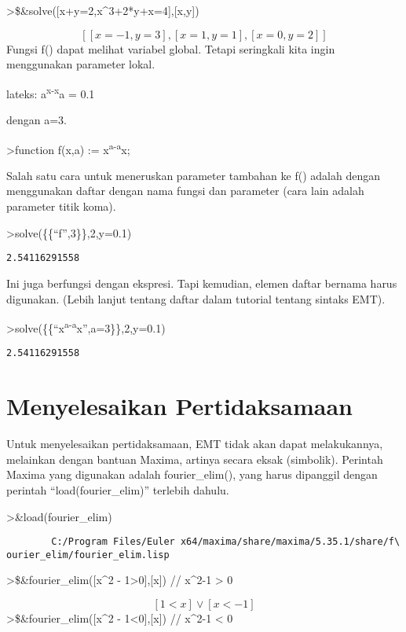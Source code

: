 \documentclass[
]{book}
\begin{document}
\textgreater\$\&solve({[}x+y=2,x\^{}3+2*y+x=4{]},{[}x,y{]})

\[\left[ \left[ x=-1 , y=3 \right]  , \left[ x=1 , y=1 \right]  , \left[ x=0 , y=2 \right]  \right]\]Fungsi f() dapat melihat variabel global. Tetapi seringkali kita ingin menggunakan parameter lokal.

lateks: a\textsuperscript{x-x}a = 0.1

dengan a=3.

\textgreater function f(x,a) := x\textsuperscript{a-a}x;

Salah satu cara untuk meneruskan parameter tambahan ke f() adalah dengan menggunakan daftar dengan nama fungsi dan parameter (cara lain adalah parameter titik koma).

\textgreater solve(\{\{``f'',3\}\},2,y=0.1)

\begin{verbatim}
2.54116291558
\end{verbatim}

Ini juga berfungsi dengan ekspresi. Tapi kemudian, elemen daftar bernama harus digunakan. (Lebih lanjut tentang daftar dalam tutorial tentang sintaks EMT).

\textgreater solve(\{\{``x\textsuperscript{a-a}x'',a=3\}\},2,y=0.1)

\begin{verbatim}
2.54116291558
\end{verbatim}

\chapter{Menyelesaikan Pertidaksamaan}\label{menyelesaikan-pertidaksamaan}

Untuk menyelesaikan pertidaksamaan, EMT tidak akan dapat melakukannya, melainkan dengan bantuan Maxima, artinya secara eksak (simbolik). Perintah Maxima yang digunakan adalah fourier\_elim(), yang harus dipanggil dengan perintah ``load(fourier\_elim)'' terlebih dahulu.

\textgreater\&load(fourier\_elim)

\begin{verbatim}
        C:/Program Files/Euler x64/maxima/share/maxima/5.35.1/share/f\
ourier_elim/fourier_elim.lisp
\end{verbatim}

\textgreater\$\&fourier\_elim({[}x\^{}2 - 1\textgreater0{]},{[}x{]}) // x\^{}2-1 \textgreater{} 0

\[\left[ 1<x \right] \lor \left[ x<-1 \right]\]\textgreater\$\&fourier\_elim({[}x\^{}2 - 1\textless0{]},{[}x{]}) // x\^{}2-1 \textless{} 0
\end{document}
